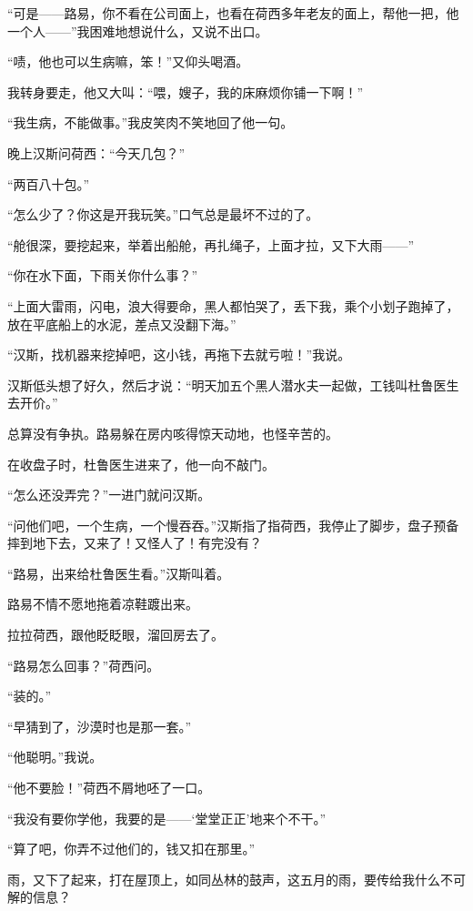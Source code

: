 \par “可是——路易，你不看在公司面上，也看在荷西多年老友的面上，帮他一把，他一个人——”我困难地想说什么，又说不出口。
\par “啧，他也可以生病嘛，笨！”又仰头喝酒。
\par 我转身要走，他又大叫：“喂，嫂子，我的床麻烦你铺一下啊！”
\par “我生病，不能做事。”我皮笑肉不笑地回了他一句。
\par 晚上汉斯问荷西：“今天几包？”
\par “两百八十包。”
\par “怎么少了？你这是开我玩笑。”口气总是最坏不过的了。
\par “舱很深，要挖起来，举着出船舱，再扎绳子，上面才拉，又下大雨——”
\par “你在水下面，下雨关你什么事？”
\par “上面大雷雨，闪电，浪大得要命，黑人都怕哭了，丢下我，乘个小划子跑掉了，放在平底船上的水泥，差点又没翻下海。”
\par “汉斯，找机器来挖掉吧，这小钱，再拖下去就亏啦！”我说。
\par 汉斯低头想了好久，然后才说：“明天加五个黑人潜水夫一起做，工钱叫杜鲁医生去开价。”
\par 总算没有争执。路易躲在房内咳得惊天动地，也怪辛苦的。
\par 在收盘子时，杜鲁医生进来了，他一向不敲门。
\par “怎么还没弄完？”一进门就问汉斯。
\par “问他们吧，一个生病，一个慢吞吞。”汉斯指了指荷西，我停止了脚步，盘子预备摔到地下去，又来了！又怪人了！有完没有？
\par “路易，出来给杜鲁医生看。”汉斯叫着。
\par 路易不情不愿地拖着凉鞋踱出来。
\par 拉拉荷西，跟他眨眨眼，溜回房去了。
\par “路易怎么回事？”荷西问。
\par “装的。”
\par “早猜到了，沙漠时也是那一套。”
\par “他聪明。”我说。
\par “他不要脸！”荷西不屑地呸了一口。
\par “我没有要你学他，我要的是——‘堂堂正正’地来个不干。”
\par “算了吧，你弄不过他们的，钱又扣在那里。”
\par 雨，又下了起来，打在屋顶上，如同丛林的鼓声，这五月的雨，要传给我什么不可解的信息？


